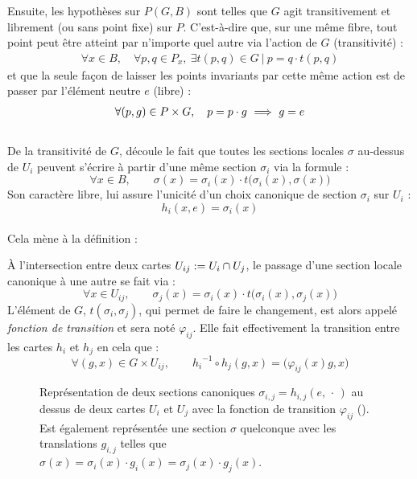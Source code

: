 \noindent
Ensuite, les hypothèses sur $P(G,B)$ sont telles que $G$ agit transitivement et librement (ou sans point fixe) sur $P$. C'est-à-dire que, sur une même fibre, tout point peut être atteint par n'importe quel autre via l'action de $G$ (transitivité) :
\begin{align*}
	\forall x\in B,\quad \forall p,q\in P_x,\ \exists t(p,q)\in G\ |\ p = q\cdot t(p,q) 
\end{align*}
et que la seule façon de laisser les points invariants par cette même action est de passer par l'élément neutre $e$ (libre) :
\begin{align*}
	\forall (p,g)\in P\times G,\quad p = p\cdot g\ \Longrightarrow\ g=e
\end{align*}
\\
De la transitivité de $G$, découle le fait que toutes les sections locales $\sigma$ au-dessus de $U_i$ peuvent s'écrire à partir d'une même section $\sigma_i$ via la formule :
\[\forall x\in B,\qquad \sigma(x) = \sigma_i(x) \cdot t\big(\sigma_i(x), \sigma(x)\big)\]
Son caractère libre, lui assure l'unicité d'un choix canonique de section $\sigma_i$ sur $U_i$ : 
\[{h_i}(x,e) = \sigma_i(x)\]
\\
Cela mène à la définition :
\begin{definition} \label{def:fonc2transi2VFP}
	À l'intersection entre deux cartes $U_{ij} := U_i\cap U_j$, le passage d'une section locale canonique à une autre se fait via :
	\[\forall x\in U_{ij},\qquad \sigma_j(x) = \sigma_i(x) \cdot t\big(\sigma_i(x), \sigma_j(x)\big)\]
	L'élément de $G$, $t(\sigma_i, \sigma_j)$, qui permet de faire le changement, est alors appelé \emph{fonction de transition} et sera noté $\varphi_{ij}$. Elle fait effectivement la transition entre les cartes $h_i$ et $h_j$ en cela que :
	\[\forall (g,x)\in G\times U_{ij},\qquad {h_i}^{-1} \circ h_j(g,x) = \big( \varphi_{ij}(x)g, x \big)\]
\end{definition}
\skipl

\begin{figure}[h]
	
	\caption[\DONE Représentation de la section canonique]
	{Représentation de deux sections canoniques $\sigma_{i,j}=h_{i,j}(e,\, \cdot\, )$ au dessus de deux cartes $U_i$ et $U_j$ avec la fonction de transition $\varphi_{ij}$ (). 
		Est également représentée une section $\sigma$ quelconque avec les translations $g_{i,j}$ telles que $\sigma(x) = \sigma_i(x)\cdot g_i(x) = \sigma_j(x)\cdot g_j(x)$.}
	\label{fig:section_cano}
\end{figure}
\skipl





